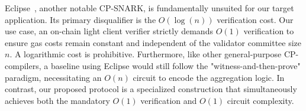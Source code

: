 Eclipse~\cite{eclipse}, another notable CP-SNARK, is fundamentally unsuited for our target application. Its primary disqualifier is the $O(\log(n))$ verification cost.  
Our use case, an on-chain light client verifier strictly demands $O(1)$ verification to ensure gas costs remain constant and independent of the validator committee size $n$. A logarithmic cost is prohibitive. 
Furthermore, like other general-purpose CP-compilers, a baseline using Eclipse would still follow the "witness-and-then-prove" paradigm, necessitating an $O(n)$ circuit to encode the aggregation logic. 
In contrast, our proposed protocol is a specialized construction that simultaneously achieves both the mandatory $O(1)$ verification and $O(1)$ circuit complexity. \\

